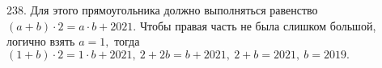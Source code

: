 238. Для этого прямоугольника должно выполняться равенство $(a+b)\cdot2=a\cdot b+2021.$ Чтобы правая часть не была слишком большой, логично взять $a=1,$ тогда
$(1+b)\cdot 2=1\cdot b+2021,\ 2+2b=b+2021,\ 2+b=2021,\ b=2019.$\\
